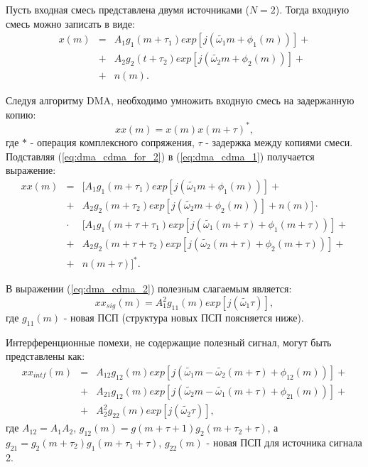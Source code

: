 Пусть входная смесь представлена двумя источниками (${N=2}$). Тогда входную смесь можно записать в виде:
\begin{eqnarray}
	\label{eq:dma_cdma_for_2}
	x(m) & = &	A_1 g_1(m + \tau_1) exp \left[ j \left( \tilde{\omega_1} m + \phi_1 (m) \right) \right] + \nonumber \\
	     & + & A_2 g_2(t + \tau_2) exp \left[ j \left(  \tilde{\omega_2} m + \phi_2 (m) \right) \right] + \\
	     & + & n(m). \nonumber
\end{eqnarray}

Следуя алгоритму DMA, необходимо умножить входную смесь на задержанную копию:
\begin{equation}
	\label{eq:dma_cdma_1}
	xx(m) = x(m)x(m+\tau)^*,
\end{equation}
где ${*}$ - операция комплексного сопряжения, ${\tau}$ - задержка между копиями смеси. Подставляя (\ref{eq:dma_cdma_for_2}) в (\ref{eq:dma_cdma_1}) получается выражение:
\begin{eqnarray}
	\label{eq:dma_cdma_2}
	xx(m) & = &[ A_1 g_1(m + \tau_1) exp \left[ j \left( \tilde{\omega_1} m + \phi_1 (m) \right) \right] + \nonumber \\
	     & + & A_2 g_2(m + \tau_2) exp \left[ j \left(  \tilde{\omega_2} m + \phi_2 (m) \right) \right] + n(m) ] \cdot \nonumber \\
	     & \cdot & [A_1 g_1(m + \tau + \tau_1) exp \left[ j \left( \tilde{\omega_1} (m + \tau) + \phi_1 (m + \tau) \right) \right]  + \nonumber \\
	     & + & A_2 g_2(m + \tau + \tau_2) exp \left[ j \left(  \tilde{\omega_2} (m + \tau) + \phi_2 (m + \tau) \right) \right] +  \\
	     & + & n(m + \tau)]^*. \nonumber
\end{eqnarray}

В выражении (\ref{eq:dma_cdma_2}) полезным слагаемым является:
\begin{equation}
	\label{eq:dma_cdma_3}
	xx_{sig}(m) = A^2_1 g_{11}(m) exp[j (\tilde {\omega_1} \tau)],
\end{equation}
где ${g_{11}(m)}$ - новая ПСП (структура новых ПСП поясняется ниже). 

Интерференционные помехи, не содержащие полезный сигнал, могут быть представлены как:
\begin{eqnarray}
	\label{eq:dma_cdma_4}
	xx_{intf}(m) & = & A_{12} g_{12}(m) exp \left[ j \left( \tilde{\omega_1} m - \tilde{\omega_2}(m + \tau) + \phi_{12} (m) \right) \right] + \nonumber \\
		& + & A_{21} g_{12}(m) exp \left[ j \left( \tilde{\omega_2} m - \tilde{\omega_1}(m + \tau) + \phi_{21} (m) \right) \right] + \nonumber \\
		& + & A^2_2 g_{22}(m) exp[j (\tilde {\omega_2} \tau)],
\end{eqnarray}
где ${A_{12}=A_1 A_2}$, ${g_{12}(m)=g(m+\tau+1)g_2(m+\tau_2+\tau)}$, а ${g_{21} = g_2(m+\tau_2)g_1(m+\tau_1+\tau)}$, ${g_{22}(m)}$ - новая ПСП для источника сигнала 2.

